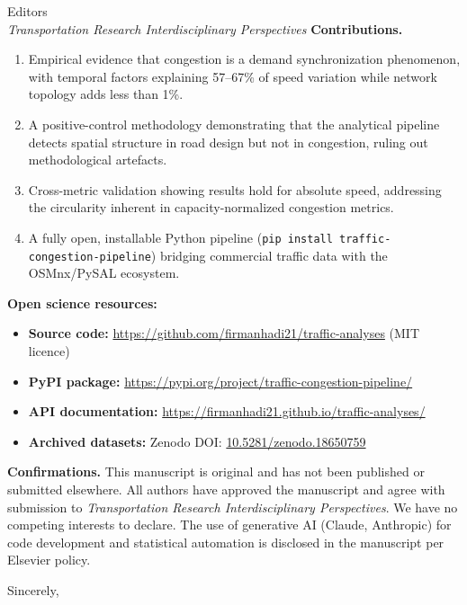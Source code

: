 \documentclass[12pt]{letter}
\begin{document}
\begin{letter}{%
Editors\\
\emph{Transportation Research Interdisciplinary Perspectives}}
\textbf{Contributions.}
\begin{enumerate}
\item Empirical evidence that congestion is a demand synchronization phenomenon, with temporal
factors explaining 57--67\% of speed variation while network topology adds less than 1\%.
\item A positive-control methodology demonstrating that the analytical pipeline detects spatial
structure in road design but not in congestion, ruling out methodological artefacts.
\item Cross-metric validation showing results hold for absolute speed, addressing the circularity
inherent in capacity-normalized congestion metrics.
\item A fully open, installable Python pipeline (\texttt{pip install traffic-congestion-pipeline})
bridging commercial traffic data with the OSMnx/PySAL ecosystem.
\end{enumerate}

\textbf{Open science resources:}
\begin{itemize}
\item \textbf{Source code:} \url{https://github.com/firmanhadi21/traffic-analyses} (MIT licence)
\item \textbf{PyPI package:} \url{https://pypi.org/project/traffic-congestion-pipeline/}
\item \textbf{API documentation:} \url{https://firmanhadi21.github.io/traffic-analyses/}
\item \textbf{Archived datasets:} Zenodo DOI: \href{https://doi.org/10.5281/zenodo.18650759}{10.5281/zenodo.18650759}
\end{itemize}

\textbf{Confirmations.}
This manuscript is original and has not been published or submitted elsewhere. All authors have
approved the manuscript and agree with submission to \emph{Transportation Research
Interdisciplinary Perspectives}. We have no competing interests to declare. The use of
generative AI (Claude, Anthropic) for code development and statistical automation is disclosed
in the manuscript per Elsevier policy.

\closing{Sincerely,}

\end{letter}
\end{document}
